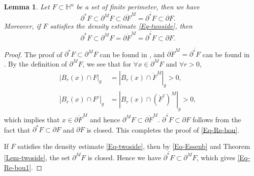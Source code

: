\documentclass[11pt,reqno]{amsart}
\newtheorem{lem}[thm]{Lemma}
\theoremstyle{definition}
\theoremstyle{remark}
\numberwithin{equation}{section}
\renewcommand{\(}{\left(}
\renewcommand{\)}{\right)}
\renewcommand{\-}{\overline}
\begin{document}
\begin{lem}\label{Lem-Re-bou}
	Let $F\subset\mathbb{H}^n$ be a set of finite perimeter, then we have
	\begin{equation}\label{Eq-Re-bou}
	\partial^{*} F\subset \partial^M F\subset \partial\mathring{F}^M=\overline{\partial^{*} F}\subset\partial F.
	\end{equation}
	Moreover, if $F$ satisfies the density estimate \eqref{Eq-twoside}, then 
	\begin{equation}\label{Eq-Re-bou1}
		\partial^{*} F\subset \partial^M F=\partial\mathring{F}^M=\overline{\partial^{*} F}\subset\partial F.
	\end{equation}
\end{lem}
\begin{proof}
	The proof of $\partial^{*} F\subset \partial^M F$ can be found in \cite[Theorem 3.61]{Ambrosio-Fusco-Pallara00}, and $\partial\mathring{F}^M=\overline{\partial^{*} F}$ can be found in \cite[Theorem 10]{Caraballo11}. By the definition of $\partial^M F$, we see that for $\forall x\in\partial^M F$ and $\forall r>0$, 
	\begin{align*}
		|B_r(x)\cap F|_g&=|B_r(x)\cap\mathring{F}^M|_g>0,\\
		|B_r(x)\cap F^c|_g&=|B_r(x)\cap(\mathring{F}^c)^M|_g>0,
	\end{align*}
	which implies that $x\in\partial\mathring{F}^M$ and hence $\partial^M F\subset \partial\mathring{F}^M$. $\overline{\partial^{*} F}\subset\partial F$ follows from the fact that $\partial^{*} F\subset\partial F$ and $\partial F$ is closed. This completes the proof of \eqref{Eq-Re-bou}.
	
	If $F$ satisfies the density estimate \eqref{Eq-twoside}, then by \eqref{Eq-Essenb} and Theorem \ref{Lem-twoside}, the set $\partial^M F$ is closed. Hence we have $\overline{\partial^{*} F}\subset \partial^M F$, which gives \eqref{Eq-Re-bou1}.
\end{proof}
\end{document}
